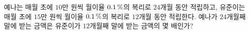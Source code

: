 예나는 매월 초에 $10$만 원씩 월이율 $0.1\mkern3mu \%$의 복리로 $24$개월 동안 적립하고, 유준이는 매월 초에 $15$만 원씩 월이율 $0.1\mkern3mu \%$의 복리로 $12$개월 동안 적립한다. 예나가 $24$개월째 말에 받는 금액은 유준이가 $12$개월째 말에 받는 금액의 몇 배인가? 
